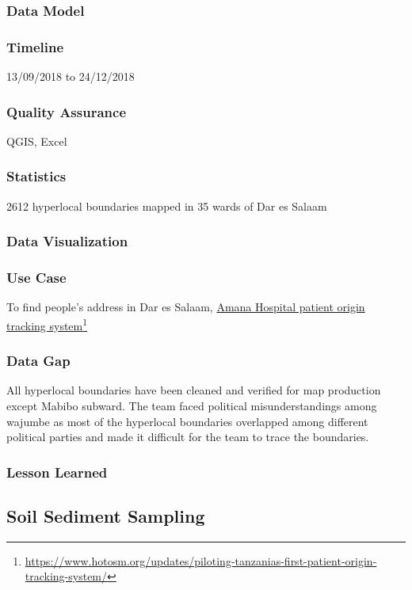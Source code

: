 \documentclass[a4paper,12pt,twoside]{article}
\begin{document}
\subsubsection{Data Model}

\subsubsection{Timeline}
13/09/2018 to 24/12/2018

\subsubsection{Quality Assurance}
QGIS, Excel

\subsubsection{Statistics}
2612 hyperlocal boundaries mapped in 35 wards of Dar es Salaam

\subsubsection{Data Visualization}

\subsubsection{Use Case}
To find people’s address in Dar es Salaam, \href{https://www.hotosm.org/updates/piloting-tanzanias-first-patient-origin-tracking-system/}{Amana Hospital patient origin tracking system}\footnote{\url{https://www.hotosm.org/updates/piloting-tanzanias-first-patient-origin-tracking-system/}}

\subsubsection{Data Gap}
All hyperlocal boundaries have been cleaned and verified for map production except Mabibo subward. The team faced political misunderstandings among wajumbe as most of the hyperlocal boundaries overlapped among different political parties and made it difficult for the team to trace the boundaries.

\subsubsection{Lesson Learned}

\newpage
\subsection{Soil Sediment Sampling}
\end{document}
